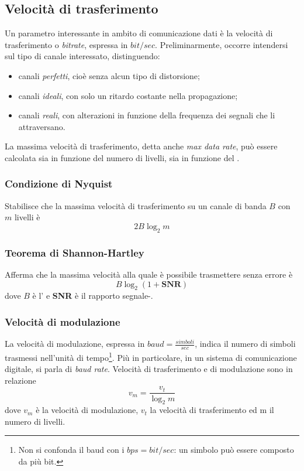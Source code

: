 \documentclass[a4paper,11pt]{article}
\def\subsub#1{\subsubsection{#1}\label{#1}}
\def\vedi#1{\nameref{#1}}
\begin{document}
\subsection{Velocità di trasferimento}
Un parametro interessante in ambito di comunicazione dati è la velocità di trasferimento o \textit{bitrate}, espressa in $bit/sec$. Preliminarmente, occorre intendersi sul tipo di canale interessato, distinguendo:
\begin{itemize}
\item canali \textit{perfetti}, cioè senza alcun tipo di distorsione;
\item canali \textit{ideali}, con solo un ritardo costante nella propagazione;
\item canali \textit{reali}, con alterazioni in funzione della frequenza dei segnali che li attraversano.
\end{itemize}
La massima velocità di trasferimento, detta anche \textit{max data rate}, può essere calcolata sia in funzione del numero di livelli, sia in funzione del \vedi{Rumore}.
\subsub{Condizione di Nyquist}
Stabilisce che la massima velocità di trasferimento su un canale di banda $B$ con $m$ livelli è
\[2B\log_{2}m\]

\subsub{Teorema di Shannon-Hartley}
Afferma che la massima velocità alla quale è possibile trasmettere senza errore è
\[B\log_{2}(1+\textbf{SNR})\]
dove $B$ è l'\vedi{Ampiezza di banda} e \textbf{SNR} è il rapporto segnale-\vedi{Rumore}.
\subsubsection{Velocità di modulazione}
La velocità di modulazione, espressa in $baud=\frac{simboli}{sec}$, indica il numero di simboli trasmessi nell'unità di tempo\footnote{Non si confonda il baud con i $bps=bit/sec$: un simbolo può essere composto da più bit.}. Più in particolare, in un sistema di comunicazione digitale, si parla di \textit{baud rate}.
Velocità di trasferimento e di modulazione sono in relazione 
\[v_{m}=\frac{v_{t}}{\log_{2}m}\]
dove $v_{m}$ è la velocità di modulazione, $v_{t}$ la velocità di trasferimento ed m il numero di livelli.
\end{document}
